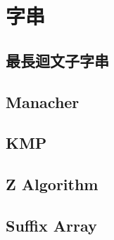
%         
%         
%         

\section{字串}
    \subsection{最長迴文子字串}
         
    \subsection{Manacher}
    \subsection{KMP}
        
    \subsection{Z Algorithm}
    \subsection{Suffix Array}
        

